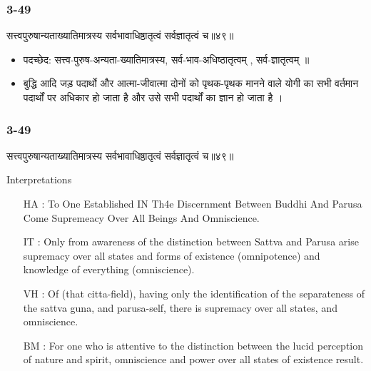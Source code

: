 \begin{frame}[fragile]\frametitle{3-49}
\begin{sanskrit}
सत्त्वपुरुषान्यताख्यातिमात्रस्य सर्वभावाधिष्ठातृत्वं सर्वज्ञातृत्वं च॥४९॥
\end{sanskrit}

\begin{itemize}
\item पदच्छेद:  सत्त्व-पुरुष-अन्यता-ख्यातिमात्रस्य, सर्व-भाव-अधिष्ठातृत्वम् , सर्व-ज्ञातृत्वम् ॥
\item बुद्धि आदि जड़ पदार्थो और आत्मा-जीवात्मा दोनों को पृथक-पृथक मानने वाले योगी का सभी वर्तमान पदार्थों पर अधिकार हो जाता है और उसे सभी पदार्थों का ज्ञान हो जाता है ।
\end{itemize}
\end{frame}

\begin{frame}[fragile]\frametitle{3-49}
\begin{sanskrit}
सत्त्वपुरुषान्यताख्यातिमात्रस्य सर्वभावाधिष्ठातृत्वं सर्वज्ञातृत्वं च॥४९॥
\end{sanskrit}

Interpretations
\begin{itemize}	
\item [HA]: To One Established IN Th4e Discernment Between Buddhi And Parusa Come Supremeacy Over All Beings And Omniscience.
\item [IT]: Only from awareness of the distinction between Sattva and Parusa arise supremacy over all states and forms of existence (omnipotence) and knowledge of everything (omniscience).
\item [VH]: Of (that citta-field), having only the identification of the separateness of the sattva guna, and parusa-self, there is supremacy over all states, and omniscience.
\item [BM]: For one who is attentive to the distinction between the lucid perception of nature and spirit, omniscience and power over all states of existence result.
\end{itemize}
\end{frame}


